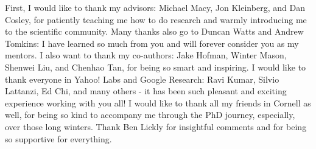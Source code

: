 \documentclass[phd,tocprelim]{cornell}
\begin{document}
\begin{acknowledgements}
First, I would like to thank my advisors: Michael Macy, Jon Kleinberg, and Dan Cosley, for patiently teaching me how to do research and warmly introducing me to the scientific community. Many thanks also go to Duncan Watts and Andrew Tomkins: I have learned so much from you and will forever consider you as my mentors. I also want to thank my co-authors: Jake Hofman, Winter Mason, Shenwei Liu, and Chenhao Tan, for being so smart and inspiring. I would like to thank everyone in Yahoo! Labs and Google Research: Ravi Kumar, Silvio Lattanzi, Ed Chi, and many others - it has been such pleasant and exciting experience working with you all! I would like to thank all my friends in Cornell as well, for being so kind to accompany me through the PhD journey, especially, over those long winters. Thank Ben Lickly for insightful comments and for being so supportive for everything. 





\end{acknowledgements}

\contentspage
\tablelistpage
\figurelistpage

\normalspacing \setcounter{page}{1} 
\pagestyle{cornell} \addtolength{\parskip}{0.5\baselineskip}

\end{document}
